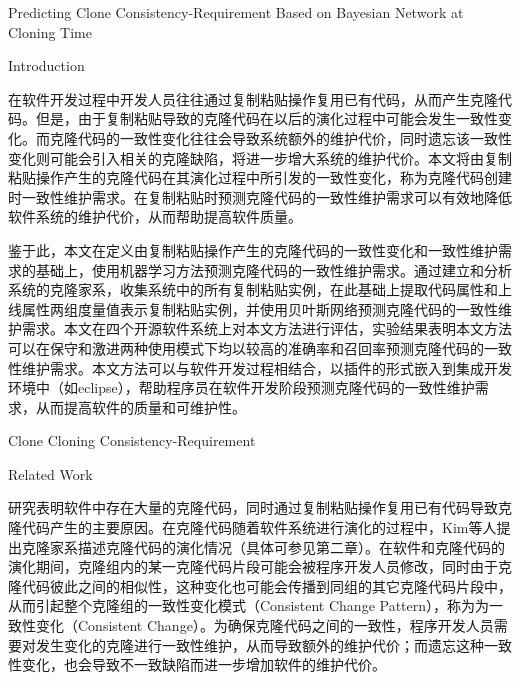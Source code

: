 
{Predicting Clone Consistency-Requirement Based on Bayesian Network at Cloning Time}

{Introduction}

在软件开发过程中开发人员往往通过复制粘贴操作复用已有代码，从而产生克隆代码。但是，由于复制粘贴导致的克隆代码在以后的演化过程中可能会发生一致性变化。而克隆代码的一致性变化往往会导致系统额外的维护代价，同时遗忘该一致性变化则可能会引入相关的克隆缺陷，将进一步增大系统的维护代价。本文将由复制粘贴操作产生的克隆代码在其演化过程中所引发的一致性变化，称为克隆代码创建时一致性维护需求。在复制粘贴时预测克隆代码的一致性维护需求可以有效地降低软件系统的维护代价，从而帮助提高软件质量。

鉴于此，本文在定义由复制粘贴操作产生的克隆代码的一致性变化和一致性维护需求的基础上，使用机器学习方法预测克隆代码的一致性维护需求。通过建立和分析系统的克隆家系，收集系统中的所有复制粘贴实例，在此基础上提取代码属性和上线属性两组度量值表示复制粘贴实例，并使用贝叶斯网络预测克隆代码的一致性维护需求。本文在四个开源软件系统上对本文方法进行评估，实验结果表明本文方法可以在保守和激进两种使用模式下均以较高的准确率和召回率预测克隆代码的一致性维护需求。本文方法可以与软件开发过程相结合，以插件的形式嵌入到集成开发环境中（如eclipse），帮助程序员在软件开发阶段预测克隆代码的一致性维护需求，从而提高软件的质量和可维护性。

{Clone Cloning Consistency-Requirement}

{Related Work}

研究表明软件中存在大量的克隆代码\cite{}，同时通过复制粘贴操作复用已有代码导致克隆代码产生的主要原因\cite{koschke2007survey}。在克隆代码随着软件系统进行演化的过程中，Kim等人提出克隆家系描述克隆代码的演化情况（具体可参见第二章）\cite{kim2005empirical}。在软件和克隆代码的演化期间，克隆组内的某一克隆代码片段可能会被程序开发人员修改，同时由于克隆代码彼此之间的相似性，这种变化也可能会传播到同组的其它克隆代码片段中，从而引起整个克隆组的一致性变化模式（Consistent Change Pattern），称为为一致性变化（Consistent Change）\cite{saha2011automatic}。为确保克隆代码之间的一致性，程序开发人员需要对发生变化的克隆进行一致性维护，从而导致额外的维护代价；而遗忘这种一致性变化，也会导致不一致缺陷而进一步增加软件的维护代价\cite{aversano2007clones}\cite{bettenburg2009empirical}。

